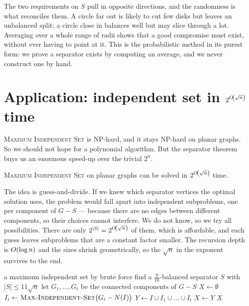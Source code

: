 \begin{intuition}
The two requirements on $S$ pull in opposite directions, and the randomness is
what reconciles them. A circle far out is likely to cut few disks but leaves an
unbalanced split; a circle close in balances well but may slice through a lot.
Averaging over a whole range of radii shows that a good compromise must exist,
without ever having to point at it. This is the probabilistic method in its
purest form: we prove a separator exists by computing an average, and we never
construct one by hand.
\end{intuition}

\section{Application: independent set in \texorpdfstring{$2^{O\!\left(\sqrt n\right)}$}{2 to the O(sqrt n)} time}\label{sec:planar-mis}

\textsc{Maximum Independent Set} is NP-hard, and it stays NP-hard on planar
graphs. So we should not hope for a polynomial algorithm. But the separator
theorem buys us an enormous speed-up over the trivial $2^n$.

\begin{theorem}\label{thm:planar-mis}
\textsc{Maximum Independent Set} on planar graphs can be solved in
$2^{O\!\left(\sqrt n\right)}$ time.
\end{theorem}

\begin{intuition}
The idea is guess-and-divide. If we knew which separator vertices the optimal
solution uses, the problem would fall apart into independent subproblems, one
per component of $G - S$ --- because there are no edges between different
components, so their choices cannot interfere. We do not know, so we try all
possibilities. There are only $2^{|S|} = 2^{O\!\left(\sqrt n\right)}$ of them, which is
affordable, and each guess leaves subproblems that are a constant factor
smaller. The recursion depth is $O\!\left(\log n\right)$ and the sizes shrink
geometrically, so the $\sqrt{n}$ in the exponent survives to the end.
\end{intuition}

\begin{algorithm}[ht]
\caption{$\MIS(G)$ for planar $G$}
\label{alg:planar-mis}
\begin{algorithmic}[1]
   \Return a maximum independent set by
      brute force \EndIf
  \State find a $\tfrac{9}{10}$-balanced separator $S$ with
         $|S| \le 11\sqrt{n}$ 
  \State let $G_1,\dots,G_t$ be the connected components of $G - S$
  \State $X \gets \emptyset$
      \State $I_i \gets \textsc{Max-Independent-Set}\bigl(G_i - N(I)\bigr)$
    \EndFor
    \State $Y \gets I \cup I_1 \cup \dots \cup I_t$
     $X \gets Y$ \EndIf
  \EndFor
  \State \Return $X$
\end{algorithmic}
\end{algorithm}

